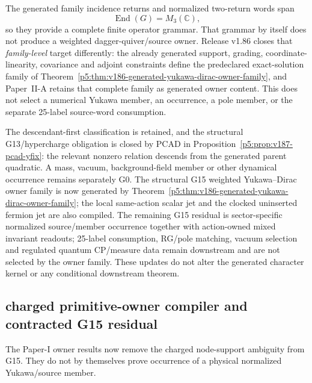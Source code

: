 \documentclass[12pt,a4paper]{article}
\begin{document}
\begin{proposition}
\label{p5:prop:v184-yukawa-family-firewall}
The generated family incidence returns and normalized two-return words span
\[
 \operatorname{End}(G)=M_3(\mathbb C),
\]
so they provide a complete finite operator grammar.  That grammar by itself
does not produce a weighted dagger-quiver/source owner.  Release v1.86 closes
that \emph{family-level} target differently: the already generated support,
grading, coordinate-linearity, covariance and adjoint constraints define the
predeclared exact-solution family of
Theorem~\ref{p5:thm:v186-generated-yukawa-dirac-owner-family}, and
Paper~II-A retains that complete family as generated owner content.  This does
not select a numerical Yukawa member, an occurrence, a pole member, or the
separate 25-label source-word consumption.
\end{proposition}

\begin{remark}
\label{p5:rem:v184-g13-g15-status}
The descendant-first classification is retained, and the structural G13/hypercharge
obligation is closed by PCAD in Proposition~\ref{p5:prop:v187-pcad-yfix}:
the relevant nonzero relation descends from the generated parent quadratic.  A mass, vacuum,
background-field member or other dynamical occurrence remains separately G0.
The structural G15 weighted Yukawa--Dirac owner family is now generated by
Theorem~\ref{p5:thm:v186-generated-yukawa-dirac-owner-family}; the local
same-action scalar jet and the clocked uninserted fermion jet are also
compiled.  The remaining G15 residual is sector-specific normalized
source/member occurrence together with action-owned mixed invariant readouts;
25-label consumption, RG/pole matching, vacuum selection and regulated
quantum CP/measure data remain downstream and are not selected by the owner
family.
These updates do not alter the generated character kernel or any conditional
downstream theorem.
\end{remark}



\subsection{charged primitive-owner compiler and contracted G15 residual}
\label{p5:sec:v372-charged-primitive-owner-g15}

The Paper-I owner results now remove the charged node-support ambiguity from
G15.  They do not by themselves prove occurrence of a physical normalized
Yukawa/source member.
\end{document}

